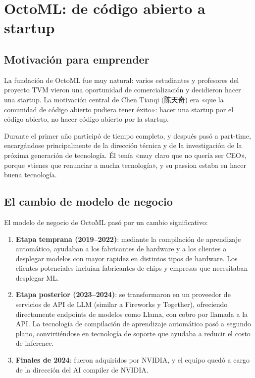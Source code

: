 \section{OctoML: de código abierto a startup}

\subsection{Motivación para emprender}

La fundación de OctoML fue muy natural: varios estudiantes y profesores del proyecto TVM vieron una oportunidad de comercialización y decidieron hacer una startup. La motivación central de Chen Tianqi (陈天奇) era «que la comunidad de código abierto pudiera tener éxito»: hacer una startup por el código abierto, no hacer código abierto por la startup.

Durante el primer año participó de tiempo completo, y después pasó a part-time, encargándose principalmente de la dirección técnica y de la investigación de la próxima generación de tecnología. Él tenía «muy claro que no quería ser CEO», porque «tienes que renunciar a mucha tecnología», y su passion estaba en hacer buena tecnología.

\subsection{El cambio de modelo de negocio}

El modelo de negocio de OctoML pasó por un cambio significativo:

\begin{enumerate}
    \item \textbf{Etapa temprana (2019--2022)}: mediante la compilación de aprendizaje automático, ayudaban a los fabricantes de hardware y a los clientes a desplegar modelos con mayor rapidez en distintos tipos de hardware. Los clientes potenciales incluían fabricantes de chips y empresas que necesitaban desplegar ML.
    \item \textbf{Etapa posterior (2023--2024)}: se transformaron en un proveedor de servicios de API de LLM (similar a Fireworks y Together), ofreciendo directamente endpoints de modelos como Llama, con cobro por llamada a la API. La tecnología de compilación de aprendizaje automático pasó a segundo plano, convirtiéndose en tecnología de soporte que ayudaba a reducir el costo de inference.
    \item \textbf{Finales de 2024}: fueron adquiridos por NVIDIA, y el equipo quedó a cargo de la dirección del AI compiler de NVIDIA.
\end{enumerate}

